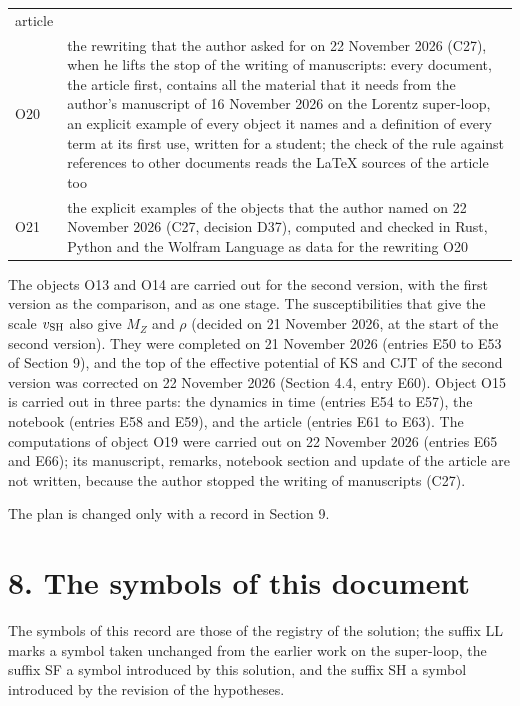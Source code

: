 \documentclass[
  10pt,
]{article}
\begin{document}
\begin{longtable}[]{@{}
  >{\raggedright\arraybackslash}p{}
  >{\raggedright\arraybackslash}p{}@{}}
article \\
O20 & the rewriting that the author asked for on 22 November 2026 (C27),
when he lifts the stop of the writing of manuscripts: every document,
the article first, contains all the material that it needs from the
author's manuscript of 16 November 2026 on the Lorentz super-loop, an
explicit example of every object it names and a definition of every term
at its first use, written for a student; the check of the rule against
references to other documents reads the LaTeX sources of the article
too \\
O21 & the explicit examples of the objects that the author named on 22
November 2026 (C27, decision D37), computed and checked in Rust, Python
and the Wolfram Language as data for the rewriting O20 \\
\end{longtable}

The objects O13 and O14 are carried out for the second version, with the
first version as the comparison, and as one stage. The susceptibilities
that give the scale \(v_{\rm SH}\) also give \(M_Z\) and \(\rho\)
(decided on 21 November 2026, at the start of the second version). They
were completed on 21 November 2026 (entries E50 to E53 of Section 9),
and the top of the effective potential of KS and CJT of the second
version was corrected on 22 November 2026 (Section 4.4, entry E60).
Object O15 is carried out in three parts: the dynamics in time (entries
E54 to E57), the notebook (entries E58 and E59), and the article
(entries E61 to E63). The computations of object O19 were carried out on
22 November 2026 (entries E65 and E66); its manuscript, remarks,
notebook section and update of the article are not written, because the
author stopped the writing of manuscripts (C27).

The plan is changed only with a record in Section 9.

\hypertarget{the-symbols-of-this-document}{%
\section{8. The symbols of this
document}\label{the-symbols-of-this-document}}

The symbols of this record are those of the registry of the solution;
the suffix LL marks a symbol taken unchanged from the earlier work on
the super-loop, the suffix SF a symbol introduced by this solution, and
the suffix SH a symbol introduced by the revision of the hypotheses.
\end{document}
